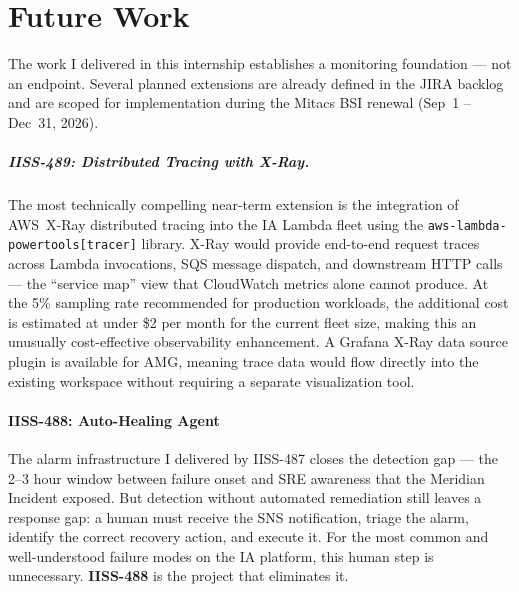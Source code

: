 
\chapter{Future Work}
\label{chap:future_work}

The work I delivered in this internship establishes a monitoring foundation ---
not an endpoint. Several planned extensions are already defined in the JIRA
backlog and are scoped for implementation during the Mitacs BSI renewal
(Sep~1 -- Dec~31, 2026).

\paragraph{IISS-489: Distributed Tracing with X-Ray.}
The most technically compelling near-term extension is the integration of
AWS~X-Ray distributed tracing into the IA Lambda fleet using the
\texttt{aws-lambda-powertools[tracer]} library. X-Ray would provide
end-to-end request traces across Lambda invocations, SQS message dispatch,
and downstream HTTP calls --- the ``service map'' view that CloudWatch metrics
alone cannot produce. At the 5\% sampling rate recommended for
production workloads, the additional cost is estimated at under \$2 per month
for the current fleet size, making this an unusually cost-effective
observability enhancement. A Grafana X-Ray data source plugin is available
for AMG, meaning trace data would flow directly into the existing workspace
without requiring a separate visualization tool.

\subsubsection{IISS-488: Auto-Healing Agent}
\label{sec:autohealing_agent}

The alarm infrastructure I delivered by IISS-487 closes the detection gap ---
the 2--3 hour window between failure onset and SRE awareness that the
Meridian Incident exposed. But detection without automated remediation still
leaves a response gap: a human must receive the SNS notification, triage the
alarm, identify the correct recovery action, and execute it. For the most
common and well-understood failure modes on the IA platform, this human step
is unnecessary. \textbf{IISS-488} is the project that eliminates it.

